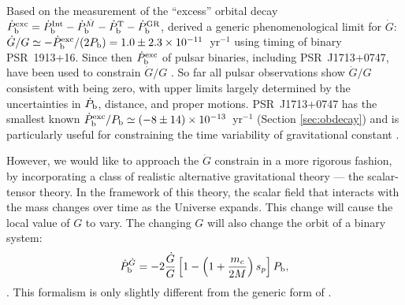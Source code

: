 Based on the measurement of the ``excess'' orbital decay 
$\dot{P}_{\rm b}^{\rm exc}=\dot{P}_{\rm b}^{\rm Int} - \dot{P}_{\rm
b}^{\dot{M}}  - \dot{P}_{\rm b}^{\rm T} - \dot{P}_{\rm b}^{\rm GR}$,
\citet{dgt88} derived a generic phenomenological limit for $\dot{G}$: 
$\dot{G}/G\simeq-\dot{P}_{\rm b}^{\rm exc}/(2P_{\rm
b})=1.0\pm2.3\times10^{-11}$~yr$^{-1}$ using timing of binary PSR~1913+16. 
{\bfref Since then $\dot{P}_{\rm b}^{\rm exc}$ of pulsar binaries, including 
PSR~J1713+0747, have been used to 
constrain $\dot{G}/G$ \citep{ktr94, lwj+09, fwe+12, nss+05}. }
So far all pulsar observations show $\dot{G}/G$ consistent with being zero, with 
upper limits largely determined by the uncertainties in $\dot P_{\rm b}$, distance, 
and proper motions.
PSR~J1713+0747 has the smallest known $\dot{P}_{\rm b}^{\rm exc}/P_{\rm
b}\simeq(-8\pm14)\times10^{-13}$~yr$^{-1}$ (Section \ref{sec:obdecay}) and is
particularly useful for constraining the time variability of gravitational
constant .

However, we would like to approach the $\dot{G}$ constrain in a more rigorous fashion,
by incorporating a class of realistic alternative gravitational theory --- the 
scalar-tensor theory.
In the framework of this theory,
the scalar field that interacts with the mass changes over time as the
Universe expands. This change will cause the local value of
$G$ to vary. The changing $G$ will also change
the orbit of a binary system:
\begin{equation}
\dot{P}_{\rm b}^{\dot{G}} = -2 \frac{\dot{G}}{G}
\left[1-\left( 1+\frac{m_c}{2M}\right) s_p\right]P_{\rm b},
\end{equation} \citep{nor90}.
This formalism is only slightly different from the generic form of
\citet{dgt88}.

